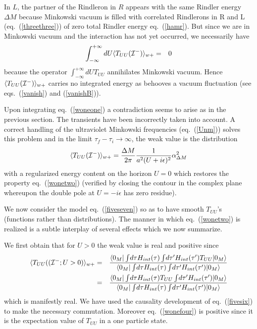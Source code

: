 \documentclass[12pt,oneside]{report}
\def\elematrice#1#2#3{\langle #1|#2|#3 \rangle}
\begin{document}
In $L$, the partner of the Rindleron in $R$ appears with the same Rindler energy
$\Delta M$ because Minkowski vacuum is filled with correlated Rindlerons
in R and L (eq.~(\ref{threethree})) of zero total Rindler energy
eq.~(\ref{hamr}). But since we are in Minkowski vacuum and the interaction has
not yet occurred, we necessarily have \begin{eqnarray}
\int_{-\infty}^{+\infty} dU \langle T_{UU}({\cal{I^-}}) \rangle_{w+} &=&
0\label{wonetwo}
\end{eqnarray}
because  the operator $\int_{-\infty}^{+\infty} dU T_{UU}$ annihilates  
Minkowski vacuum.  Hence  $\langle T_{UU}({\cal{I^-}})
\rangle_{w+}$
 carries no integrated energy as behooves a vacuum fluctuation
(see eqs.~(\ref{vanish}) and (\ref{vanishB})).

Upon integrating eq.~(\ref{woneone}) a contradiction
seems to arise as in the previous section. The transients have been
incorrectly taken into account. A correct handling of the ultraviolet
Minkowski frequencies (eq.~(\ref{Unm})) solves this problem and 
in the limit $\tau_f - \tau_i \to \infty$, the weak value is the distribution
\begin{equation} \langle T_{UU}({\cal{I^-}}) \rangle_{w+} = {\Delta M \over 2\pi}{1 \over
a^2 (U+i\epsilon)^2} \alpha_{\Delta M}^2 \label{wonethree}
\end{equation}
with a regularized energy content on the horizon $U=0$ which restores the
property eq.~(\ref{wonetwo}) (verified by closing the contour in the complex
plane whereupon the double pole at $U=-i\epsilon$ has zero residue).

We now consider the model eq.~(\ref{fiveseven}) so as to have smooth $T_{UU}$'s
(functions rather than distributions). 
The manner in which eq.~(\ref{wonetwo}) is realized is a subtle interplay of
several effects which we now summarize.

We first obtain that for $U>0$ the weak value is real and positive since
\begin{eqnarray}
\langle T_{UU}(({\cal{I^-}};U>0) \rangle_{w+} &=&{ \elematrice{0_M}{
\int \! d\tau H_{int}(\tau) \int\! d\tau^\prime H_{int}(\tau^\prime)
T_{UU} }{0_M} \over \elematrice{0_M}{
\int \! d\tau H_{int}(\tau) \int\! d\tau^\prime H_{int}(\tau^\prime)}
{0_M}}\nonumber\\
\ &=& {
\elematrice{0_M}{
\int \! d\tau H_{int}(\tau)  
T_{UU}
\int\! d\tau^\prime H_{int}(\tau^\prime)
 }{0_M} \over \elematrice{0_M}{
\int \! d\tau H_{int}(\tau) \int\! d\tau^\prime H_{int}(\tau^\prime)}
{0_M}}
\label{wonefour}
\end{eqnarray}
which is manifestly real. We have used the causality development of 
eq.~(\ref{fivesix}) to make the necessary commutation. Moreover 
eq.~(\ref{wonefour})
is positive since it is the expectation value of $T_{UU}$ in a one particle
state. 
\end{document}

